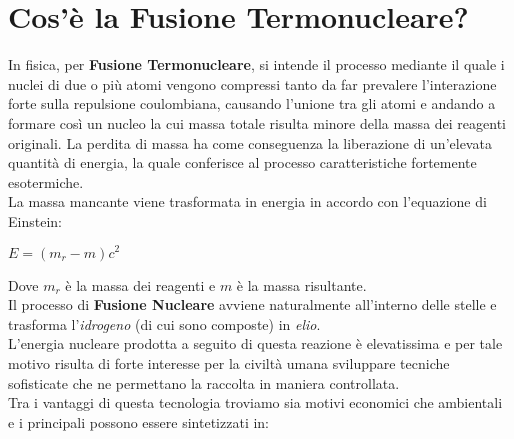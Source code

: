 \section*{Cos'è la Fusione Termonucleare?}
In fisica, per \textbf{Fusione Termonucleare}, si intende il processo mediante il quale i nuclei di due o più atomi vengono compressi tanto da far prevalere l’interazione forte sulla repulsione coulombiana, causando l'unione tra gli atomi e andando a formare così un nucleo la cui massa totale risulta minore della massa dei reagenti originali. La perdita di massa ha come conseguenza la liberazione di un’elevata quantità di energia, la quale conferisce al processo caratteristiche fortemente esotermiche.\\
La massa mancante viene trasformata in energia in accordo con l’equazione di Einstein:
\begin{center}
	$E = (m_r - m)c^2$
\end{center}
Dove $ m_r $ è la massa dei reagenti e $ m $ è la massa risultante.\\
Il processo di \textbf{Fusione Nucleare} avviene naturalmente all'interno delle stelle e trasforma l'\textit{idrogeno} (di cui sono composte) in \textit{elio}.\\
L'energia nucleare prodotta a seguito di questa reazione è elevatissima e per tale motivo risulta di forte interesse per la civiltà umana sviluppare tecniche sofisticate che ne permettano la raccolta in maniera controllata.\\
Tra i vantaggi di questa tecnologia troviamo sia motivi economici che ambientali e i principali possono essere sintetizzati in:
